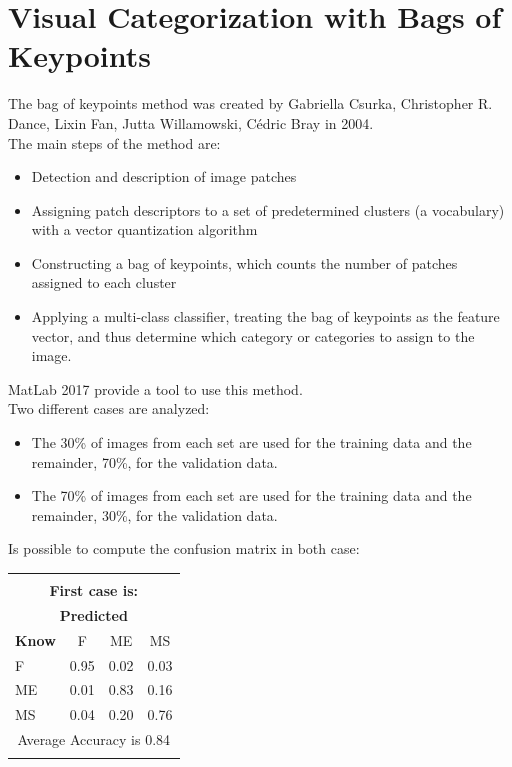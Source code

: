 \documentclass[12pt]{article} %
\begin{document}
\section{Visual Categorization with Bags of Keypoints }
The bag of keypoints method was created by Gabriella Csurka, Christopher R. Dance, Lixin Fan, Jutta Willamowski, Cédric Bray in 2004.\\
The main steps of the method are:
\begin{itemize}
\item Detection and description of image patches 
\item Assigning patch descriptors to a set of predetermined clusters (a vocabulary) with a vector quantization algorithm 
\item  Constructing a bag of keypoints, which counts the number of patches assigned to each cluster
\item Applying a multi-class classifier, treating the bag of keypoints as the feature vector, and thus determine which category or categories to assign to the image. 
\end{itemize}
MatLab 2017 provide a tool to use this method.
\\Two different cases are analyzed:
\begin{itemize}
\item The 30\% of images from each set are used for the training data and the remainder, 70\%, for the validation data.
\item The 70\% of images from each set are used for the training data and the remainder, 30\%, for the validation data.
\end{itemize} 
Is possible to compute the confusion matrix in both case:\\
\begin{minipage}{0.5\textwidth}
\begin{center}
\begin{tabular}{l|c|c|c|}
\multicolumn{4}{c}{}\\
 \multicolumn{4}{c}{ \textbf{First case is:}}\\
 \multicolumn{4}{c}{ \textbf{ Predicted}}\\
 \textbf{Know}&F&ME&MS\\ \hline\hline
F   &0.95&0.02&0.03\\
ME &0.01&0.83&0.16\\
MS &0.04&0.20&0.76\\
\multicolumn{4}{c}{Average Accuracy is 0.84}\\
\multicolumn{4}{c}{}\\
\end{tabular}
\end{center}
\end{minipage}
\end{document}
